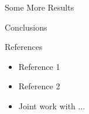 \begin{frame}
\begin{columns}
\begin{column}{.33\textwidth}
  \begin{block}{Some More Results}

    \ReplaceWithContent

  \end{block}


    \vfill 
    

  \begin{block}{Conclusions}

    \ReplaceWithContent

  \end{block}


  \vfill 


  \begin{block}{References}
    {\small
    \begin{itemize}
      \item Reference 1

      \item Reference 2
    \end{itemize}
    }

  \end{block}


  \vfill


  \begin{itemize}
    \item Joint work with ...
  \end{itemize}


\endminipage
\end{column}
\end{columns}
\end{frame}

